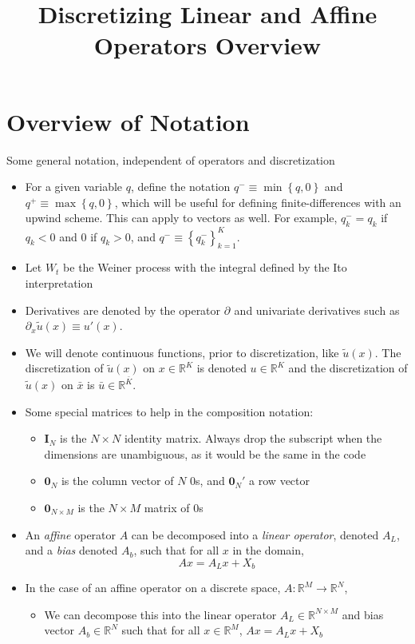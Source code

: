 \documentclass[11pt]{article}
\newcommand{\set}[1]{\ensuremath{\left\{{#1}\right\}}}
\newcommand{\R}{\ensuremath{\mathbb{R}}}
\newcommand{\D}[1][]{\ensuremath{\partial_{#1}}}
\begin{document}
	\title{Discretizing Linear and Affine Operators Overview}
	\author{}
	\date{}
	\maketitle
	\section{Overview of Notation}
	Some general notation, independent of operators and discretization
	\begin{itemize}
		\item For a given variable $q$, define the notation $q^{-} \equiv \min\set{q,0}$ and $q^{+} \equiv \max\set{q,0}$, which will be useful for defining finite-differences with an upwind scheme.  This can apply to vectors as well. For example, $q_k^{-} = q_k$ if $q_k < 0$ and $0$ if $q_k > 0$, and $q^{-} \equiv \set{q^{-}_k}_{k=1}^{K}$.
		\item Let $W_t$ be the Weiner process with the integral defined by the Ito interpretation
		\item Derivatives are denoted by the operator $\D$ and univariate derivatives such as $\D[x]\tilde{u}(x) \equiv u'(x)$.
		\item We will denote continuous functions, prior to discretization, like $\tilde{u}(x)$.  The discretization of $\tilde{u}(x)$ on $x\in \R^K$ is denoted $u \in \R^K$ and the discretization of $\tilde{u}(x)$ on $\bar{x}$ is $\bar{u} \in \R^{\bar{K}}$.
		\item Some special matrices to help in the composition notation:
		\begin{itemize}
			\item $\mathbf{I}_N$ is the $N\times N$ identity matrix.  Always drop the subscript when the dimensions are unambiguous, as it would be the same in the code
			\item $\mathbf{0}_N$ is the column vector of $N$ $0$s, and $\mathbf{0}_N'$ a row vector
			\item $\mathbf{0}_{N\times M}$ is the $N\times M$ matrix of $0$s
		\end{itemize}
  	\item An \textit{affine} operator $A$ can be decomposed into a \textit{linear operator}, denoted $A_L$, and a \textit{bias} denoted $A_b$, such that for all $x$ in the domain,
		$$
		A x = A_L x + X_b
		$$
		\item In the case of an affine operator on a discrete space, $A : \R^M \to \R^N$,
		\begin{itemize}
			\item We can decompose this into the linear operator $A_L \in \R^{N\times M}$ and bias vector $A_b \in \R^{N}$ such that for all $x\in\R^M$, $A x = A_L x + X_b$
		\end{itemize}
	\end{itemize}
\end{document}
